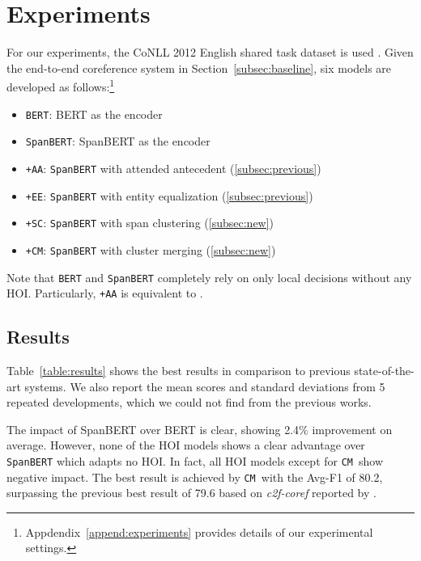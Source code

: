 \documentclass[11pt,a4paper]{article}
\newcommand{\textsec}[1]{\textsection\ref{#1}}
\newcommand\CM{\texttt{CM}}
\begin{document}
%
 
\section{Experiments}
\label{sec:exp}

For our experiments, the CoNLL 2012 English shared task dataset is used \citep{pradhan-etal-2012-conll}.
Given the end-to-end coreference system in Section~\ref{subsec:baseline}, six models are developed as follows:\footnote{Appdendix~\ref{append:experiments} provides details of our experimental settings.} 

\begin{itemize}
\small\setlength\itemsep{0em}
\item \texttt{BERT}: BERT \cite{devlin-etal-2019-bert} as the encoder
\item \texttt{SpanBERT}: SpanBERT \cite{spanbert-joshi} as the encoder
\item \texttt{+AA}: \texttt{SpanBERT} with attended antecedent (\textsec{subsec:previous})
\item \texttt{+EE}: \texttt{SpanBERT} with entity equalization (\textsec{subsec:previous})
\item \texttt{+SC}: \texttt{SpanBERT} with span clustering (\textsec{subsec:new})
\item \texttt{+CM}: \texttt{SpanBERT} with cluster merging (\textsec{subsec:new})
\end{itemize}

\noindent Note that \noindent \texttt{BERT} and \texttt{SpanBERT} completely rely on only local decisions without any HOI. 
Particularly, \texttt{+AA} is equivalent to \citet{spanbert-joshi}.


\subsection{Results}
\label{subsec:results}

Table~\ref{table:results} shows the best results in comparison to previous state-of-the-art systems. We also report the mean scores and standard deviations from 5 repeated developments, which we could not find from the previous works.


The impact of SpanBERT over BERT is clear, showing 2.4\% improvement on average.
However, none of the HOI models shows a clear advantage over \texttt{SpanBERT} which adapts no HOI.
In fact, all HOI models except for \CM\ show negative impact.
The best result is achieved by \CM\ with the Avg-F1 of 80.2, surpassing the previous best result of 79.6 based on \textit{c2f-coref} reported by \citet{spanbert-joshi}.
\end{document}
